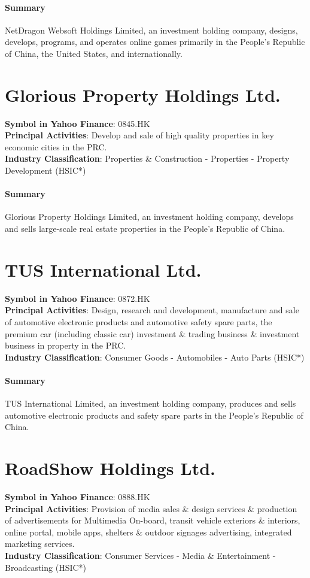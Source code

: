 \paragraph{Summary}
NetDragon Websoft Holdings Limited, an investment holding company, designs, develops, programs, and operates online games primarily in the People's Republic of China, the United States, and internationally.


\section{Glorious Property Holdings Ltd.}
\textbf{Symbol in Yahoo Finance}: 0845.HK\\
\textbf{Principal Activities}: Develop and sale of high quality properties in key economic cities in the PRC.\\
\textbf{Industry Classification}: Properties \& Construction - Properties - Property Development (HSIC*)
\paragraph{Summary}
Glorious Property Holdings Limited, an investment holding company, develops and sells large-scale real estate properties in the People's Republic of China.


\section{TUS International Ltd.}
\textbf{Symbol in Yahoo Finance}: 0872.HK\\
\textbf{Principal Activities}: Design, research and development, manufacture and sale of automotive electronic products and automotive safety spare parts, the premium car (including classic car) investment \& trading business \& investment business in property in the PRC.\\
\textbf{Industry Classification}: Consumer Goods - Automobiles - Auto Parts (HSIC*)
\paragraph{Summary}
TUS International Limited, an investment holding company, produces and sells automotive electronic products and safety spare parts in the People's Republic of China.


\section{RoadShow Holdings Ltd.}
\textbf{Symbol in Yahoo Finance}: 0888.HK\\
\textbf{Principal Activities}: Provision of media sales \& design services \& production of advertisements for Multimedia On-board, transit vehicle exteriors \& interiors, online portal, mobile apps, shelters \& outdoor signages advertising, integrated marketing services.\\
\textbf{Industry Classification}: Consumer Services - Media \& Entertainment - Broadcasting (HSIC*)
